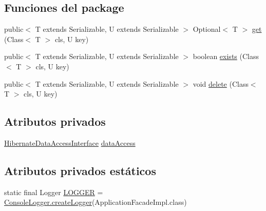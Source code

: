 \subsection*{Funciones del \textquotesingle{}package\textquotesingle{}}
\begin{DoxyCompactItemize}
\item 
public$<$ T extends Serializable, U extends Serializable $>$ Optional$<$ T $>$ \mbox{\hyperlink{classcom_1_1ruralhousejsf_1_1business_logic_1_1_application_facade_impl_aab772c94cd469793cc01ec1418e29763}{get}} (Class$<$ T $>$ cls, U key)
\item 
public$<$ T extends Serializable, U extends Serializable $>$ boolean \mbox{\hyperlink{classcom_1_1ruralhousejsf_1_1business_logic_1_1_application_facade_impl_a2a873fe74350d41be72c6fde461351fd}{exists}} (Class$<$ T $>$ cls, U key)
\item 
public$<$ T extends Serializable, U extends Serializable $>$ void \mbox{\hyperlink{classcom_1_1ruralhousejsf_1_1business_logic_1_1_application_facade_impl_a9a11ee0688c0a679574bb3edb260f927}{delete}} (Class$<$ T $>$ cls, U key)
\end{DoxyCompactItemize}
\subsection*{Atributos privados}
\begin{DoxyCompactItemize}
\item 
\mbox{\hyperlink{interfacecom_1_1ruralhousejsf_1_1data_access_1_1_hibernate_data_access_interface}{Hibernate\+Data\+Access\+Interface}} \mbox{\hyperlink{classcom_1_1ruralhousejsf_1_1business_logic_1_1_application_facade_impl_a96ac80fe606a4649e5fbbbd24935690a}{data\+Access}}
\end{DoxyCompactItemize}
\subsection*{Atributos privados estáticos}
\begin{DoxyCompactItemize}
\item 
static final Logger \mbox{\hyperlink{classcom_1_1ruralhousejsf_1_1business_logic_1_1_application_facade_impl_a4d2aed9fcae945d5ffaa63947bb56cde}{L\+O\+G\+G\+ER}} = \mbox{\hyperlink{classcom_1_1ruralhousejsf_1_1logger_1_1_console_logger_a520321643663e37d95761134a35505cd}{Console\+Logger.\+create\+Logger}}(Application\+Facade\+Impl.\+class)
\end{DoxyCompactItemize}


